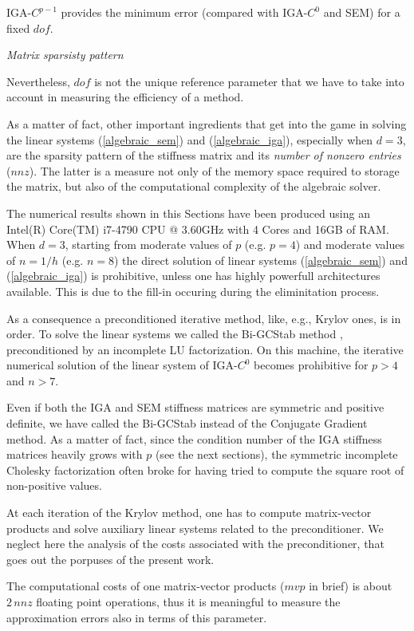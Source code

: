 \documentclass[11pt]{article}
\begin{document}
IGA-$C^{p-1}$ provides the minimum error
(compared with IGA-$C^0$ and SEM) for a fixed $dof$.

\null
\emph{Matrix sparsisty pattern}

Nevertheless, $dof$ is not the unique reference parameter that we have to take 
into account in measuring the efficiency of a method.

As a matter of fact, other important ingredients that get into the game 
in solving the linear systems (\ref{algebraic_sem}) and
(\ref{algebraic_iga}), especially when $d=3$,
 are the sparsity pattern of the stiffness matrix and
its \emph{number of nonzero entries} ($nnz$).
The latter is a measure not only of the memory space
required to storage the matrix, but also of the computational 
complexity of the algebraic solver.

The numerical results shown in this Sections have been produced using an
Intel(R) Core(TM) i7-4790 CPU @ 3.60GHz with 4 Cores and 16GB  of RAM.
When $d=3$, starting from moderate values of $p$ (e.g. $p=4$) and moderate
values of $n=1/h$ (e.g. $n=8$) the direct solution of linear systems
(\ref{algebraic_sem}) and
(\ref{algebraic_iga}) is prohibitive, 
unless one has highly powerfull architectures available. 
 This is due to the fill-in occuring during 
the eliminitation  process.

As a consequence a preconditioned
 iterative method, like, e.g., Krylov ones, is in order. 
To solve the linear systems we called the Bi-GCStab method \cite{vander2003},
preconditioned by an incomplete LU factorization. 
On this machine, the iterative numerical solution of the linear 
system of IGA-$C^0$ becomes
prohibitive for $p>4$ and $n>7$. 

Even if both the  IGA and SEM
stiffness matrices are symmetric and positive definite, we have called the
Bi-GCStab instead of the Conjugate Gradient method.
As a matter of fact, since the condition
number of the IGA stiffness matrices heavily grows with $p$ (see the next
sections), the symmetric incomplete
Cholesky factorization often broke for having tried to compute the 
square root of non-positive values.


At each iteration of the Krylov method,
one has to compute matrix-vector products and solve 
auxiliary linear systems related to the preconditioner. We neglect here the
analysis of the costs associated with the preconditioner, 
that goes out the porpuses of
the present work.  

The computational costs of one matrix-vector products ($mvp$ 
in brief) is about
 $2\, nnz$ floating point operations, thus it is meaningful to measure the 
approximation errors also in terms of this parameter.
\end{document}

